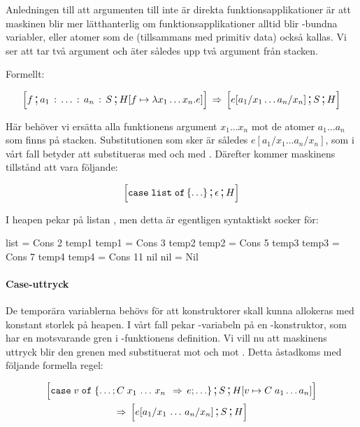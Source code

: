\documentclass[../Core]{subfiles}
\begin{document}
Anledningen till att argumenten till  inte är direkta funktionsapplikationer
är att maskinen blir mer lätthanterlig om funktionsapplikationer alltid
blir -bundna variabler, eller atomer som de (tillsammans med primitiv data)
också kallas. Vi ser att  tar två argument och äter således upp två
argument från stacken.

Formellt:

\[
\text{\large$$}\Big[f \,\text{\Large;}\, a_{1} \,:\, \ldots \,:\, a_{n} \,:\, S \,\text{\Large;}\, H[f\mapsto\lambda x_{1}\ldots x_{n}.e]\Big]\,\Rightarrow\, \text{\large$$}\Big[e[a{}_{1}/x_{1}\ldots a_{n}/x_{n}] \,\text{\Large;}\, S \,\text{\Large;}\, H\Big]
\]


Här behöver vi ersätta alla funktionens argument $x_{1}\ldots x_{n}$ mot
de atomer $a_{1}\ldots a_{n}$ som finns på stacken. Substitutionen som sker är 
således $e[a{}_{1}/x_{1}\ldots a_{n}/x_{n}]$, som i vårt fall betyder att
 substitueras med  och  med . Därefter kommer maskinens tillstånd att vara följande:

\[
\text{\large$$}\Big[\mathtt{case\; list\; of\,\lbrace\ldots\rbrace} \,\text{\Large;}\, \epsilon \,\text{\Large;}\, H\Big]
\]


I heapen pekar  på listan \ic{[2,3,5,7,11]}, men detta är egentligen syntaktiskt socker
för:

\begin{codeEx}
list = Cons 2 temp1
temp1 = Cons 3 temp2
temp2 = Cons 5 temp3
temp3 = Cons 7 temp4
temp4 = Cons 11 nil
nil = Nil
\end{codeEx}

\paragraph{Case-uttryck} De temporära variablerna behövs för att konstruktorer skall kunna
allokeras med konstant storlek på heapen. I vårt fall pekar
-variabeln på en -konstruktor, som har en motsvarande gren
i -funktionens definition. Vi vill nu att maskinens uttryck
blir den grenen med  substituerat mot  och  mot .
Detta åstadkoms med följande formella regel:

\begin{multline*}
\text{\large$$}\Big[\mathtt{case}\; v\; \mathtt{of}\;\{\ldots;C\; x_{1}\,\ldots\, x_{n}\;\,\Rightarrow\, e;\ldots\} \,\text{\Large;}\, S \,\text{\Large;}\, H[v\mapsto C\; a_{1}\ldots a_{n}]\Big]\\
\,\Rightarrow\, \text{\large$$}\Big[e[a_{1}/x_{1}\,\ldots\, a_{n}/x_{n}] \,\text{\Large;}\, S \,\text{\Large;}\, H\Big]
\end{multline*}
\end{document}
